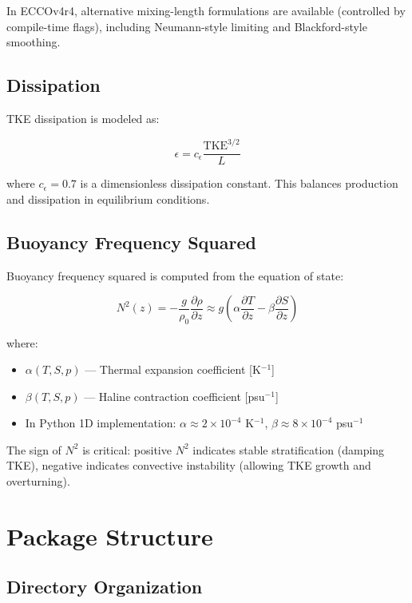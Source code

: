 \documentclass[11pt, a4paper]{article}
\begin{document}
In ECCOv4r4, alternative mixing-length formulations are available (controlled by compile-time flags), including Neumann-style limiting and Blackford-style smoothing.

\subsection{Dissipation}

TKE dissipation is modeled as:

\begin{equation}
\epsilon = c_{\epsilon} \frac{\text{TKE}^{3/2}}{L}
\end{equation}

where $c_{\epsilon} = 0.7$ is a dimensionless dissipation constant. This balances production and dissipation in equilibrium conditions.

\subsection{Buoyancy Frequency Squared}

Buoyancy frequency squared is computed from the equation of state:

\begin{equation}
N^2(z) = -\frac{g}{\rho_0}\frac{\partial \rho}{\partial z} \approx g\left(\alpha \frac{\partial T}{\partial z} - \beta \frac{\partial S}{\partial z}\right)
\end{equation}

where:

\begin{itemize}
    \item $\alpha(T,S,p)$ — Thermal expansion coefficient [K$^{-1}$]
    \item $\beta(T,S,p)$ — Haline contraction coefficient [psu$^{-1}$]
    \item In Python 1D implementation: $\alpha \approx 2 \times 10^{-4}$ K$^{-1}$, $\beta \approx 8 \times 10^{-4}$ psu$^{-1}$
\end{itemize}

The sign of $N^2$ is critical: positive $N^2$ indicates stable stratification (damping TKE), negative indicates convective instability (allowing TKE growth and overturning).

\section{Package Structure}

\subsection{Directory Organization}
\end{document}
